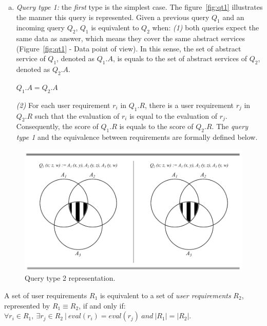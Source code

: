 \begin{enumerate}[a)]
\item \textit{Query type 1:} the \textit{first} type is the simplest case. The figure~\ref{fig:qt1} illustrates the manner this query is represented. Given a previous query $Q_{1}$ and an incoming query $Q_{2}$, $Q_{1}$ is equivalent to $Q_{2}$ when: \textit{(1)} both queries expect the same data as answer, which means they cover the same abstract services (Figure~\ref{fig:qt1} - Data point of view). In this sense, the set of abstract service of $Q_{1}$, denoted as $Q_{1}.A$, is equals to the set of abstract services of $Q_{2}$, denoted as $Q_{2}.A$.
%
\begin{center}
$Q_{1}.A = Q_{2}.A$
\end{center}
%
\textit{(2)} For each user requirement $r_{i}$ in $Q_{1}.R$, there is a user requirement $r_{j}$ in $Q_{2}.R$ such that the evaluation of $r_{i}$ is equal to the evaluation of $r_{j}$. 
Consequently, the score of $Q_{1}.R$ is equals to the score of $Q_{2}.R$. The \textit{query type 1} and the equivalence between requirements are formally defined below.
\end{enumerate}

\begin{figure}[!htbp]
\center
\includegraphics[scale=0.7]{images/QT2-ABSTRACT-SERVICES.pdf}
\caption{Query type 2 representation.}
\label{fig:qt2}
\end{figure}

\begin{definition}\label{def:reqeq}
A set of user requirements $R_{1}$ is equivalent to a set of \textsl{user requirements} $R_{2}$, represented by $R_{1} \equiv R_{2}$, if and only if: $\forall r_{i} \in R_{1}, \ \exists r_{j} \in R_{2} \ \vert \ eval (r_{i}) = eval(r_{j}) \ and \ \vert R_{1} \vert = \vert R_{2} \vert$.
\end{definition}

